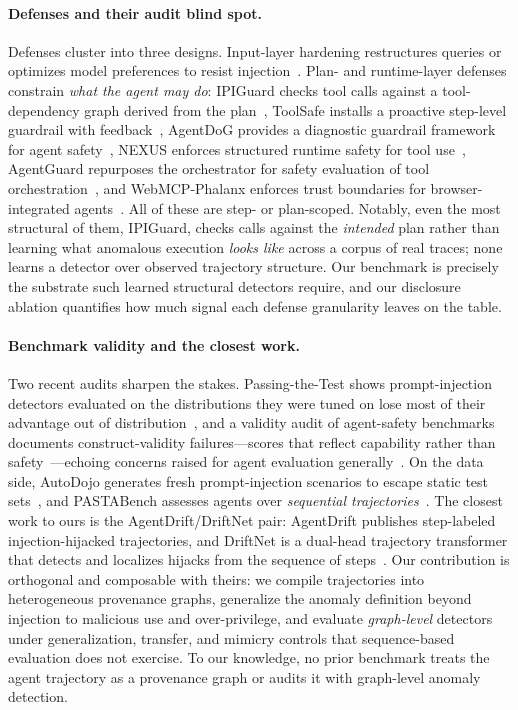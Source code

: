 \paragraph{Defenses and their audit blind spot.} Defenses cluster into three designs. Input-layer hardening restructures queries or optimizes model preferences to resist injection~\cite{chen2024struq,chen2024secalign}. Plan- and runtime-layer defenses constrain \emph{what the agent may do}: IPIGuard checks tool calls against a tool-dependency graph derived from the plan~\cite{an2025ipiguard}, ToolSafe installs a proactive step-level guardrail with feedback~\cite{mou2026toolsafe}, AgentDoG provides a diagnostic guardrail framework for agent safety~\cite{liu2026agentdog}, NEXUS enforces structured runtime safety for tool use~\cite{hossain2026nexus}, AgentGuard repurposes the orchestrator for safety evaluation of tool orchestration~\cite{chen2025agentguard}, and WebMCP-Phalanx enforces trust boundaries for browser-integrated agents~\cite{lee2026webmcpphalanx}. All of these are step- or plan-scoped. Notably, even the most structural of them, IPIGuard, checks calls against the \emph{intended} plan rather than learning what anomalous execution \emph{looks like} across a corpus of real traces; none learns a detector over observed trajectory structure. Our benchmark is precisely the substrate such learned structural detectors require, and our disclosure ablation quantifies how much signal each defense granularity leaves on the table.

\paragraph{Benchmark validity and the closest work.} Two recent audits sharpen the stakes. Passing-the-Test shows prompt-injection detectors evaluated on the distributions they were tuned on lose most of their advantage out of distribution~\cite{liu2026passing}, and a validity audit of agent-safety benchmarks documents construct-validity failures---scores that reflect capability rather than safety~\cite{wang2026safety}---echoing concerns raised for agent evaluation generally~\cite{mohammadi2025evaluation}. On the data side, AutoDojo generates fresh prompt-injection scenarios to escape static test sets~\cite{ma2026autodojo}, and PASTABench assesses agents over \emph{sequential trajectories}~\cite{sun2026pastabench}. The closest work to ours is the AgentDrift/DriftNet pair: AgentDrift publishes step-labeled injection-hijacked trajectories, and DriftNet is a dual-head trajectory transformer that detects and localizes hijacks from the sequence of steps~\cite{pinjari2026agentdrift,pinjari2026driftnet}. Our contribution is orthogonal and composable with theirs: we compile trajectories into heterogeneous provenance graphs, generalize the anomaly definition beyond injection to malicious use and over-privilege, and evaluate \emph{graph-level} detectors under generalization, transfer, and mimicry controls that sequence-based evaluation does not exercise. To our knowledge, no prior benchmark treats the agent trajectory as a provenance graph or audits it with graph-level anomaly detection.
